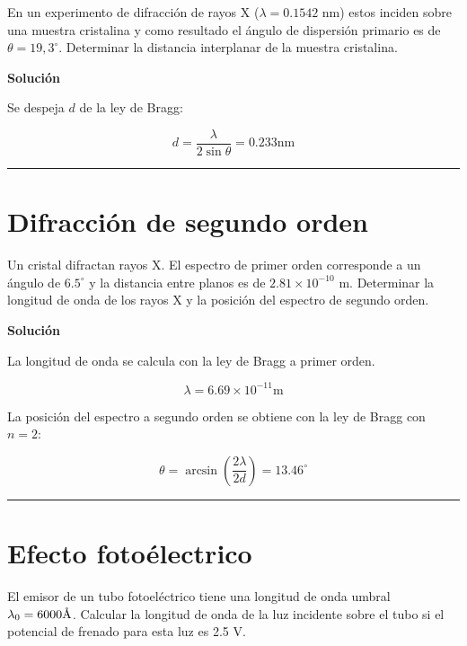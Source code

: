 \documentclass[12pt]{article}
\newcommand{\angstrom}{\mbox{\normalfont\AA}}
\begin{document}
	En un experimento de difracción de rayos X ($\lambda= 0.1542$ nm) estos inciden
	sobre una muestra cristalina y como resultado el ángulo de dispersión primario
	es de $\theta = 19,3^{\circ}$. Determinar la distancia interplanar de la muestra cristalina.

\begin{center}
	\textbf{Solución}
\end{center}

Se despeja $d$ de la ley de Bragg:

\begin{equation*}
d = \frac{\lambda}{2 \sin\theta} = 0.233 \text{nm}
\end{equation*}

\noindent\rule{16.5cm}{0.4pt}

\section{Difracción de segundo orden}

	Un cristal difractan rayos X. El espectro de primer orden corresponde a un
	ángulo de $6.5^{\circ}$ y la distancia entre planos es de $2.81 \times 10^{-10}$ m. Determinar la
	longitud de onda de los rayos X y la posición del espectro de segundo orden.



\begin{center}
	\textbf{Solución}
\end{center}

La longitud de onda se calcula con la ley de Bragg a primer orden.

\begin{equation*}
\lambda  = 6.69 \times 10^{-11} \text{m}
\end{equation*}

La posición del espectro a segundo orden se obtiene con la ley de Bragg con $n=2$:

\begin{equation*}
\theta = \arcsin\left(\frac{2\lambda}{2d}\right) = 13.46^{\circ}
\end{equation*}

\noindent\rule{16.5cm}{0.4pt}

\section{Efecto fotoélectrico}

	El emisor de un tubo fotoeléctrico tiene una longitud de onda umbral $\lambda_0= 6000\angstrom$. Calcular la longitud de onda de la luz incidente sobre el tubo si el potencial de frenado para esta luz es 2.5 V.
\end{document}
